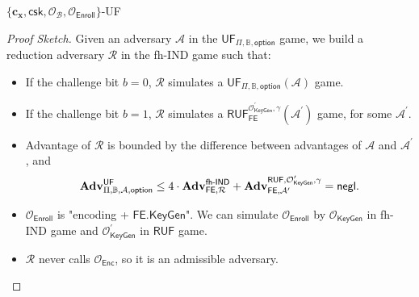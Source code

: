 \begin{frame}{$\{ \mathbf{c_x}, \textsf{csk}, \mathcal{O}_\mathcal{B}, \mathcal{O}_{\textsf{Enroll}} \}$-UF}

\begin{proof}[Proof Sketch]

Given an adversary $\mathcal{A}$ in the $\textsf{UF}_{\Pi, \mathbb{B}, \textsf{option}}$ game, we build a reduction adversary $\mathcal{R}$ in the fh-IND game such that:

\begin{itemize}
	\item<2-> If the challenge bit $b = 0$, $\mathcal{R}$ simulates a $\textsf{UF}_{\Pi, \mathbb{B}, \textsf{option}}(\mathcal{A})$ game.

	\item<3-> If the challenge bit $b = 1$, $\mathcal{R}$ simulates a $\textsf{RUF}^{\mathcal{O}^\prime_{\textsf{KeyGen}}, \gamma}_{\textsf{FE}}(\mathcal{A}^\prime)$ game, for some $\mathcal{A}^\prime$.

	\item<4-> Advantage of $\mathcal{R}$ is bounded by the difference between advantages of $\mathcal{A}$ and $\mathcal{A}^\prime$, and
	\[
		\mathbf{Adv}^{\textsf{UF}}_{\Pi, \mathbb{B}, \mathcal{A}, \textsf{option}} \leq 4 \cdot \mathbf{Adv}_{\textsf{FE}, \mathcal{R}}^{\textsf{fh-IND}} + \mathbf{Adv}_{\textsf{FE}, \mathcal{A}^\prime}^{\textsf{RUF},\mathcal{O}^\prime_{\textsf{KeyGen}}, \gamma} = \mathsf{negl}.
	\]

	\item<5-> $\mathcal{O}_{\textsf{Enroll}}$ is "encoding + $\textsf{FE.KeyGen}$". We can simulate $\mathcal{O}_{\textsf{Enroll}}$ by $\mathcal{O}_{\textsf{KeyGen}}$ in fh-IND game and $\mathcal{O}^\prime_{\textsf{KeyGen}}$ in $\textsf{RUF}$ game. 
	
	\item<6-> $\mathcal{R}$ never calls $\mathcal{O}_{\textsf{Enc}}$, so it is an admissible adversary.

\end{itemize}

\end{proof}

\end{frame}



